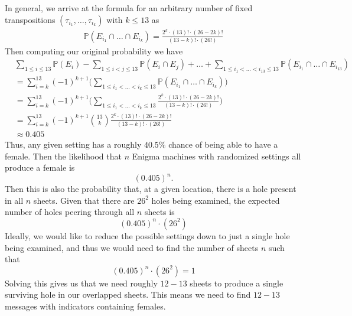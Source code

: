 \noindent In general, we arrive at the formula for an arbitrary
number of fixed transpositions $(\tau_{i_1}, \dots, \tau_{i_k})$ with
$k \le 13$ as
\begin{align*}
  \mathbb{P}(E_{i_1}\cap\dots\cap E_{i_k}) = \frac{2^k\cdot
  (13)!\cdot(26-2k)!}{(13-k)!\cdot(26!)}
\end{align*}
Then computing our original probability we have
\begin{align*}
  & \sum_{1 \le i \le 13}\mathbb{P}(E_i) - \sum_{1\le i < j \le
  13}\mathbb{P}(E_i\cap E_j) + \dots + \sum_{1\le i_1 < \dots <i_{13}
  \le 13}\mathbb{P}(E_{i_1}\cap\dots\cap E_{i_{13}})                \\
  & = \sum_{i=k}^{13}(-1)^{k+1}\biggl(\sum_{1\le i_1 < \dots < i_k
  \le 13}\mathbb{P}(E_{i_1}\cap\dots\cap E_{i_k})\biggr)
  \\
  & = \sum_{i=k}^{13}(-1)^{k+1}\biggl(\sum_{1\le i_1 < \dots < i_k
  \le 13}\frac{2^k\cdot (13)!\cdot(26-2k)!}{(13-k)!\cdot(26!)}\biggr)
  \\
  & = \sum_{i=k}^{13}(-1)^{k+1}{13\choose k}\frac{2^k\cdot
  (13)!\cdot(26-2k)!}{(13-k)!\cdot(26!)}
  \\
  & \approx 0.405
\end{align*}
\noindent Thus, any given setting has a roughly $40.5\%$ chance of
being able to have a female. Then the likelihood that $n$ Enigma
machines with randomized settings all produce a female is
\[
  (0.405)^n.
\]
Then this is also the probability that, at a given location, there is
a hole present in all $n$ sheets. Given that there are $26^2$ holes
being examined, the expected number of holes peering through all $n$ sheets is
\[
  (0.405)^n\cdot(26^2)
\]
Ideally, we would like to reduce the possible settings down to just a
single hole being examined, and thus we would need to find the number
of sheets $n$ such that
\[
  (0.405)^n\cdot(26^2) = 1
\]
Solving this gives us that we need roughly $12-13$ sheets to produce
a single surviving hole in our overlapped sheets. This means we need
to find $12-13$ messages with indicators containing females.

